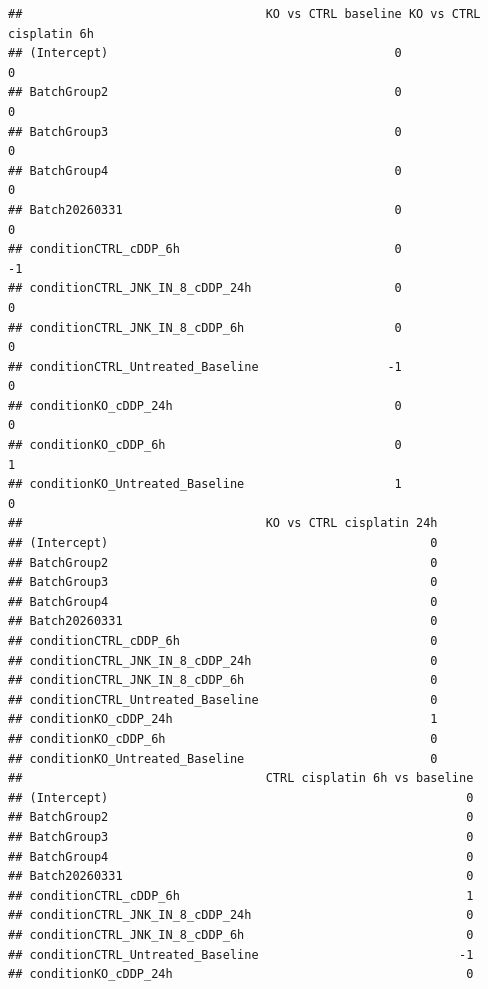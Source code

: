 \documentclass[
  10pt,
]{article}
\begin{document}
\begin{verbatim}
##                                  KO vs CTRL baseline KO vs CTRL cisplatin 6h
## (Intercept)                                        0                       0
## BatchGroup2                                        0                       0
## BatchGroup3                                        0                       0
## BatchGroup4                                        0                       0
## Batch20260331                                      0                       0
## conditionCTRL_cDDP_6h                              0                      -1
## conditionCTRL_JNK_IN_8_cDDP_24h                    0                       0
## conditionCTRL_JNK_IN_8_cDDP_6h                     0                       0
## conditionCTRL_Untreated_Baseline                  -1                       0
## conditionKO_cDDP_24h                               0                       0
## conditionKO_cDDP_6h                                0                       1
## conditionKO_Untreated_Baseline                     1                       0
##                                  KO vs CTRL cisplatin 24h
## (Intercept)                                             0
## BatchGroup2                                             0
## BatchGroup3                                             0
## BatchGroup4                                             0
## Batch20260331                                           0
## conditionCTRL_cDDP_6h                                   0
## conditionCTRL_JNK_IN_8_cDDP_24h                         0
## conditionCTRL_JNK_IN_8_cDDP_6h                          0
## conditionCTRL_Untreated_Baseline                        0
## conditionKO_cDDP_24h                                    1
## conditionKO_cDDP_6h                                     0
## conditionKO_Untreated_Baseline                          0
##                                  CTRL cisplatin 6h vs baseline
## (Intercept)                                                  0
## BatchGroup2                                                  0
## BatchGroup3                                                  0
## BatchGroup4                                                  0
## Batch20260331                                                0
## conditionCTRL_cDDP_6h                                        1
## conditionCTRL_JNK_IN_8_cDDP_24h                              0
## conditionCTRL_JNK_IN_8_cDDP_6h                               0
## conditionCTRL_Untreated_Baseline                            -1
## conditionKO_cDDP_24h                                         0

\end{verbatim}
\end{document}
